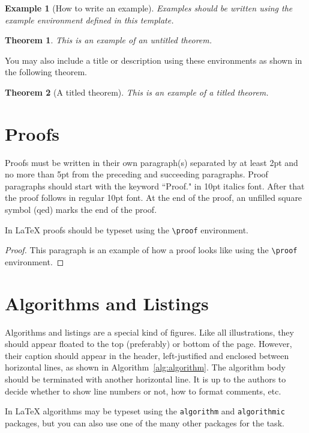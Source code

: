 \documentclass{article}
\newtheorem{example}{Example}
\newtheorem{theorem}{Theorem}
\begin{document}
\begin{example}[How to write an example]
    Examples should be written using the example environment defined in this template.
\end{example}

\begin{theorem}
    This is an example of an untitled theorem.
\end{theorem}

You may also include a title or description using these environments as shown in the following theorem.

\begin{theorem}[A titled theorem]
    This is an example of a titled theorem.
\end{theorem}

\section{Proofs}

Proofs must be written in their own paragraph(s) separated by at least 2pt and no more than 5pt from the preceding and succeeding paragraphs. Proof paragraphs should start with the keyword ``Proof." in 10pt italics font. After that the proof follows in regular 10pt font. At the end of the proof, an unfilled square symbol (qed) marks the end of the proof.

In \LaTeX{} proofs should be typeset using the \texttt{\textbackslash{proof}} environment.

\begin{proof}
    This paragraph is an example of how a proof looks like using the \texttt{\textbackslash{proof}} environment.
\end{proof}


\section{Algorithms and Listings}

Algorithms and listings are a special kind of figures. Like all illustrations, they should appear floated to the top (preferably) or bottom of the page. However, their caption should appear in the header, left-justified and enclosed between horizontal lines, as shown in Algorithm~\ref{alg:algorithm}. The algorithm body should be terminated with another horizontal line. It is up to the authors to decide whether to show line numbers or not, how to format comments, etc.

In \LaTeX{} algorithms may be typeset using the {\tt algorithm} and {\tt algorithmic} packages, but you can also use one of the many other packages for the task.
\end{document}
